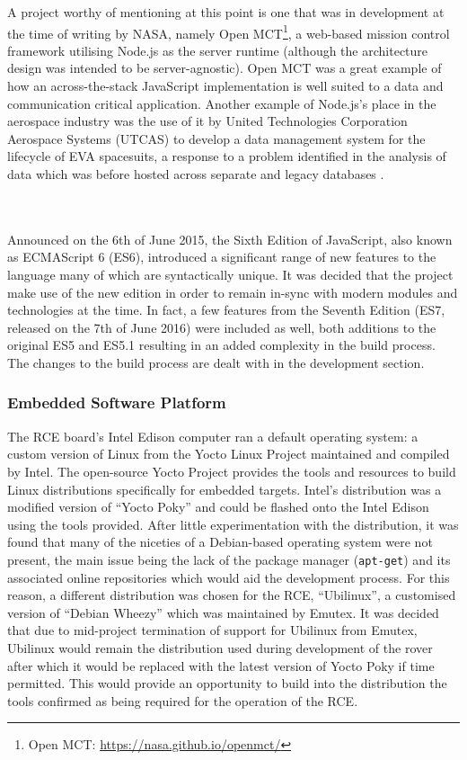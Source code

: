         A project worthy of mentioning at this point is one that was in development at the time of writing by NASA, namely Open MCT\footnote{Open MCT: \url{https://nasa.github.io/openmct/}}, a web-based mission control framework utilising Node.js as the server runtime (although the architecture design was intended to be server-agnostic). Open MCT was a great example of how an across-the-stack JavaScript implementation is well suited to a data and communication critical application. Another example of Node.js's place in the aerospace industry was the use of it by United Technologies Corporation Aerospace Systems (UTCAS) to develop a data management system for the lifecycle of EVA spacesuits, a response to a problem identified in the analysis of data which was before hosted across separate and legacy databases \cite{nodejsSpaceSuit_2016}.        
        
      \\\\
        Announced on the 6th of June 2015, the Sixth Edition of JavaScript, also known as ECMAScript 6 (ES6), introduced a significant range of new features to the language many of which are syntactically unique. It was decided that the project make use of the new edition in order to remain in-sync with modern modules and technologies at the time. In fact, a few features from the Seventh Edition (ES7, released on the 7th of June 2016) were included as well, both additions to the original ES5 and ES5.1 resulting in an added complexity in the build process. The changes to the build process are dealt with in the development section.
        
    \subsubsection{Embedded Software Platform}
      The RCE board's Intel Edison computer ran a default operating system: a custom version of Linux from the Yocto Linux Project maintained and compiled by Intel. The open-source Yocto Project provides the tools and resources to build Linux distributions specifically for embedded targets. Intel's distribution was a modified version of ``Yocto Poky'' and could be flashed onto the Intel Edison using the tools provided. After little experimentation with the distribution, it was found that many of the niceties of a Debian-based operating system were not present, the main issue being the lack of the package manager (\texttt{apt-get}) and its associated online repositories which would aid the development process. For this reason, a different distribution was chosen for the RCE, ``Ubilinux'', a customised version of ``Debian Wheezy'' which was maintained by Emutex. It was decided that due to mid-project termination of support for Ubilinux from Emutex, Ubilinux would remain the distribution used during development of the rover after which it would be replaced with the latest version of Yocto Poky if time permitted. This would provide an opportunity to build into the distribution the tools confirmed as being required for the operation of the RCE.
    
